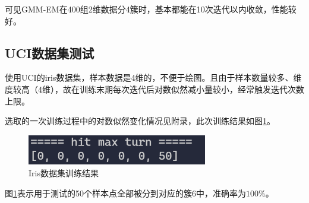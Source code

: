 可见GMM-EM在400组2维数据分4簇时，基本都能在10次迭代以内收敛，性能较好。

\subsection{UCI数据集测试}

使用UCI的iris数据集\cite{uci-iris}，样本数据是4维的，不便于绘图。且由于样本数量较多、维度较高（4维），故在训练末期每次迭代后对数似然减小量较小，经常触发迭代次数上限。

选取的一次训练过程中的对数似然变化情况见附录，此次训练结果如图\ref{uci-iris}。

\begin{figure}[htbp]
    \centering
    \includegraphics[width=0.7\textwidth]{figures/Figure_19.png}
    \caption{Iris数据集训练结果}
    \label{uci-iris}
\end{figure}

图\ref{uci-iris}表示用于测试的50个样本点全部被分到对应的簇6中，准确率为$100\%$。
